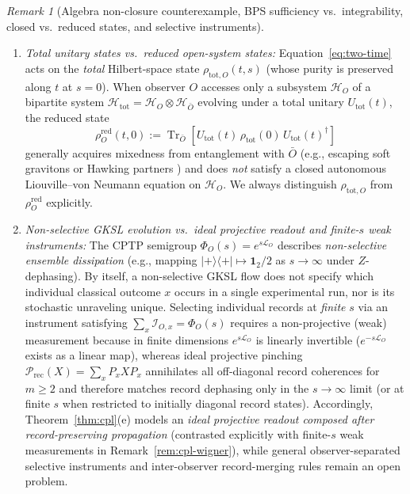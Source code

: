 \documentclass[11pt,a4paper]{article}
\theoremstyle{definition}
\theoremstyle{remark}
\newtheorem{remark}{Remark}
\newcommand{\Tr}{\operatorname{Tr}}
\newcommand{\cH}{\mathcal{H}}
\newcommand{\cL}{\mathcal{L}}
\newcommand{\cP}{\mathcal{P}}
\newcommand{\cI}{\mathcal{I}}
\newcommand{\1}{\mathbf{1}}
\begin{document}
\begin{remark}[Algebra non-closure counterexample, BPS sufficiency vs.\ integrability, closed vs.\ reduced states, and selective instruments]
\begin{enumerate}
  \item \emph{Total unitary states vs.\ reduced open-system states:} Equation~\eqref{eq:two-time} acts on the \emph{total} Hilbert-space state $\rho_{\mathrm{tot},O}(t,s)$ (whose purity is preserved along $t$ at $s=0$). When observer $O$ accesses only a subsystem $\cH_O$ of a bipartite system $\cH_{\mathrm{tot}} = \cH_O \otimes \cH_{\bar O}$ evolving under a total unitary $U_{\mathrm{tot}}(t)$, the reduced state
  \begin{equation}\label{eq:reduced-state}
    \rho_O^{\mathrm{red}}(t,0) := \Tr_{\bar O}\!\left[U_{\mathrm{tot}}(t)\,\rho_{\mathrm{tot}}(0)\,U_{\mathrm{tot}}(t)^\dagger\right]
  \end{equation}
  generally acquires mixedness from entanglement with $\bar O$ (e.g., escaping soft gravitons or Hawking partners \cite{DSW2023}) and does \emph{not} satisfy a closed autonomous Liouville--von Neumann equation on $\cH_O$. We always distinguish $\rho_{\mathrm{tot},O}$ from $\rho_O^{\mathrm{red}}$ explicitly.
  \item \emph{Non-selective GKSL evolution vs.\ ideal projective readout and finite-$s$ weak instruments:} The CPTP semigroup $\Phi_O(s) = e^{s\cL_O}$ describes \emph{non-selective ensemble dissipation} (e.g., mapping $|+\rangle\langle +| \mapsto \1_2/2$ as $s\to\infty$ under $Z$-dephasing). By itself, a non-selective GKSL flow does not specify which individual classical outcome $x$ occurs in a single experimental run, nor is its stochastic unraveling unique. Selecting individual records at \emph{finite} $s$ via an instrument satisfying $\sum_x \cI_{O,x} = \Phi_O(s)$ requires a non-projective (weak) measurement because in finite dimensions $e^{s\cL_O}$ is linearly invertible ($e^{-s\cL_O}$ exists as a linear map), whereas ideal projective pinching $\cP_{\mathrm{rec}}(X) = \sum_x P_x X P_x$ annihilates all off-diagonal record coherences for $m\ge 2$ and therefore matches record dephasing only in the $s\to\infty$ limit (or at finite $s$ when restricted to initially diagonal record states). Accordingly, Theorem~\ref{thm:cpl}(e) models an \emph{ideal projective readout composed after record-preserving propagation} (contrasted explicitly with finite-$s$ weak measurements in Remark~\ref{rem:cpl-wigner}), while general observer-separated selective instruments and inter-observer record-merging rules remain an open problem.
\end{enumerate}
\end{remark}
\end{document}
